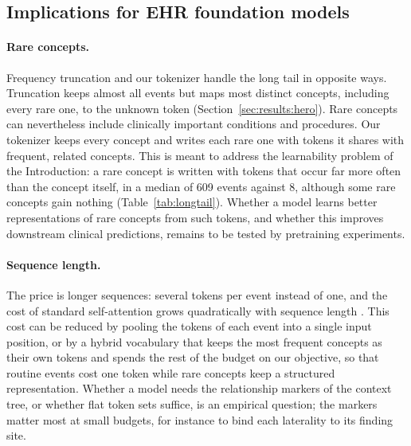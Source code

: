 \subsection{Implications for EHR foundation models}
\label{sec:discussion:ehr}

\paragraph{Rare concepts.}
Frequency truncation and our tokenizer handle the long tail in opposite ways.
Truncation keeps almost all events but maps most distinct concepts, including every rare one, to the unknown token (Section~\ref{sec:results:hero}).
Rare concepts can nevertheless include clinically important conditions and procedures.
Our tokenizer keeps every concept and writes each rare one with tokens it shares with frequent, related concepts.
This is meant to address the learnability problem of the Introduction: a rare concept is written with tokens that occur far more often than the concept itself, in a median of 609 events against 8, although some rare concepts gain nothing (Table~\ref{tab:longtail}).
Whether a model learns better representations of rare concepts from such tokens, and whether this improves downstream clinical predictions, remains to be tested by pretraining experiments.

\paragraph{Sequence length.}
The price is longer sequences: several tokens per event instead of one, and the cost of standard self-attention grows quadratically with sequence length \cite{vaswani2017attention}.
This cost can be reduced by pooling the tokens of each event into a single input position, or by a hybrid vocabulary that keeps the most frequent concepts as their own tokens and spends the rest of the budget on our objective, so that routine events cost one token while rare concepts keep a structured representation.
Whether a model needs the relationship markers of the context tree, or whether flat token sets suffice, is an empirical question; the markers matter most at small budgets, for instance to bind each laterality to its finding site.

